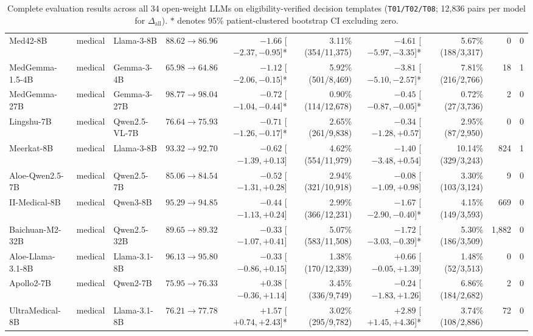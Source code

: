 \documentclass[11pt]{article}
\begin{document}
\begin{table}[t]
\begin{tabular}{@{}lllrrrrrrr@{}}
Med42-8B & medical & Llama-3-8B & $88.62 \to 86.96$ & $-1.66$ [$-2.37, -0.95$]* & 3.11\% (354/11,375) & $-4.61$ [$-5.97, -3.35$]* & 5.67\% (188/3,317) & 0 & 0 \\
MedGemma-1.5-4B & medical & Gemma-3-4B & $65.98 \to 64.86$ & $-1.12$ [$-2.06, -0.15$]* & 5.92\% (501/8,469) & $-3.81$ [$-5.10, -2.57$]* & 7.81\% (216/2,766) & 18 & 1 \\
MedGemma-27B & medical & Gemma-3-27B & $98.77 \to 98.04$ & $-0.72$ [$-1.04, -0.44$]* & 0.90\% (114/12,678) & $-0.45$ [$-0.87, -0.05$]* & 0.72\% (27/3,736) & 2 & 0 \\
Lingshu-7B & medical & Qwen2.5-VL-7B & $76.64 \to 75.93$ & $-0.71$ [$-1.26, -0.17$]* & 2.65\% (261/9,838) & $-0.34$ [$-1.28, +0.57$]\phantom{*} & 2.95\% (87/2,950) & 0 & 0 \\
Meerkat-8B & medical & Llama-3-8B & $93.32 \to 92.70$ & $-0.62$ [$-1.39, +0.13$]\phantom{*} & 4.62\% (554/11,979) & $-1.40$ [$-3.48, +0.54$]\phantom{*} & 10.14\% (329/3,243) & 824 & 1 \\
Aloe-Qwen2.5-7B & medical & Qwen2.5-7B & $85.06 \to 84.54$ & $-0.52$ [$-1.31, +0.28$]\phantom{*} & 2.94\% (321/10,918) & $-0.08$ [$-1.09, +0.98$]\phantom{*} & 3.30\% (103/3,124) & 9 & 0 \\
II-Medical-8B & medical & Qwen3-8B & $95.29 \to 94.85$ & $-0.44$ [$-1.13, +0.24$]\phantom{*} & 2.99\% (366/12,231) & $-1.67$ [$-2.90, -0.40$]* & 4.15\% (149/3,593) & 669 & 0 \\
Baichuan-M2-32B & medical & Qwen2.5-32B & $89.65 \to 89.32$ & $-0.33$ [$-1.07, +0.41$]\phantom{*} & 5.07\% (583/11,508) & $-1.72$ [$-3.03, -0.39$]* & 5.30\% (186/3,509) & 1,882 & 0 \\
Aloe-Llama-3.1-8B & medical & Llama-3.1-8B & $96.13 \to 95.80$ & $-0.33$ [$-0.86, +0.15$]\phantom{*} & 1.38\% (170/12,339) & $+0.66$ [$-0.05, +1.39$]\phantom{*} & 1.48\% (52/3,513) & 0 & 0 \\
Apollo2-7B & medical & Qwen2-7B & $75.95 \to 76.33$ & $+0.38$ [$-0.36, +1.14$]\phantom{*} & 3.45\% (336/9,749) & $-0.24$ [$-1.83, +1.26$]\phantom{*} & 6.86\% (184/2,682) & 2 & 0 \\
UltraMedical-8B & medical & Llama-3.1-8B & $76.21 \to 77.78$ & $+1.57$ [$+0.74, +2.43$]* & 3.02\% (295/9,782) & $+2.89$ [$+1.45, +4.36$]* & 3.74\% (108/2,886) & 72 & 0 \\
\bottomrule
\end{tabular}
\caption{Complete evaluation results across all 34 open-weight LLMs on eligibility-verified decision templates (\texttt{T01/T02/T08}; 12,836 pairs per model for $\Delta_{\text{all}}$). $*$ denotes 95\% patient-clustered bootstrap CI excluding zero.}
\label{tab:app_all_models}
\end{table}
\end{document}

